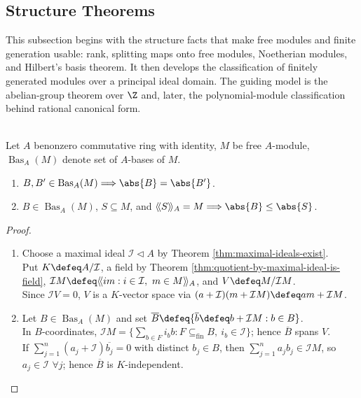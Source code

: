 \subsection{Structure Theorems}

This subsection begins with the structure facts that make free modules and
finite generation usable: rank, splitting maps onto free modules, Noetherian
modules, and Hilbert's basis theorem. It then develops the classification of
finitely generated modules over a principal ideal domain. The guiding model is
the abelian-group theorem over $\Z$ and, later, the polynomial-module
classification behind rational canonical form.

\begin{theorem} \label{thm:free-module-rank-well-defined-commutative} \\
Let $A$ benonzero commutative ring with identity, $M$ be free $A$-module, $\operatorname{Bas}_A(M)$ denote set of $A$-bases of $M$.
\begin{enumerate}[label=(\roman*)]
\setlength{\itemsep}{0pt}
\item $B,B'\in\operatorname{Bas}_A(M)\Longrightarrow\abs{B}=\abs{B'}$.
\item $B\in\operatorname{Bas}_A(M)$, $S\subseteq M$, and $\langle\!\langle S\rangle\!\rangle_A=M\Longrightarrow\abs{B}\leq\abs{S}$.
\end{enumerate}
\begin{proof}
\begin{enumerate}[label=(\roman*)]
\setlength{\itemsep}{0pt}
\item Choose a maximal ideal $\mathcal{I}\lhd A$ by Theorem \ref{thm:maximal-ideals-exist}.\\
Put $K\defeq A/\mathcal{I}$, a field by Theorem \ref{thm:quotient-by-maximal-ideal-is-field}, $\mathcal{I}M\defeq\langle\!\langle im:i\in\mathcal{I},\ m\in M\rangle\!\rangle_A$, and $V\defeq M/\mathcal{I}M$.\\
Since $\mathcal{I}V=0$, $V$ is a $K$-vector space via $(a+\mathcal{I})(m+\mathcal{I}M)\defeq am+\mathcal{I}M$.
\item Let $B\in\operatorname{Bas}_A(M)$ and set $\overline{B}\defeq\{\overline{b}\defeq b+\mathcal{I}M:b\in B\}$.\\
In $B$-coordinates, $\mathcal{I}M=\{\sum\limits_{b\in F}i_bb:F\subseteq_{\operatorname{fin}}B,\ i_b\in\mathcal{I}\}$; hence $\overline{B}$ spans $V$.\\
If $\sum\limits_{j=1}^n(a_j+\mathcal{I})\overline{b_j}=0$ with distinct $b_j\in B$, then $\sum\limits_{j=1}^na_jb_j\in\mathcal{I}M$, so $a_j\in\mathcal{I}$ $\forall j$; hence $\overline{B}$ is $K$-independent.\\

\end{enumerate}
\end{proof}
\end{theorem}
